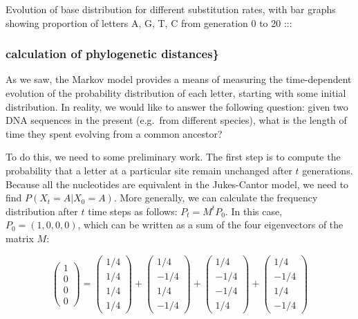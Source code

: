 \documentclass[
  letterpaper,
  DIV=11,
  numbers=noendperiod]{scrreprt}
\begin{document}
Evolution of base distribution for different substitution rates, with
bar graphs showing proportion of letters A, G, T, C from generation 0 to
20 :::

\subsubsection{calculation of phylogenetic
distances\}}\label{calculation-of-phylogenetic-distances}

As we saw, the Markov model provides a means of measuring the
time-dependent evolution of the probability distribution of each letter,
starting with some initial distribution. In reality, we would like to
answer the following question: given two DNA sequences in the present
(e.g.~from different species), what is the length of time they spent
evolving from a common ancestor?

To do this, we need to some preliminary work. The first step is to
compute the probability that a letter at a particular site remain
unchanged after \(t\) generations. Because all the nucleotides are
equivalent in the Jukes-Cantor model, we need to find
\(P(X_t = A | X_0 = A)\). More generally, we can calculate the frequency
distribution after \(t\) time steps as follows: \(P_t = M^t P_0\). In
this case, \(P_0 = (1,0,0,0)\), which can be written as a sum of the
four eigenvectors of the matrix \(M\):

\[ 
\left(\begin{array}{c} 1 \\ 0 \\ 0 \\ 0 \end{array}\right) = \left(\begin{array}{c} 1/4 \\ 1/4 \\ 1/4 \\ 1/4 \end{array}\right) + \left(\begin{array}{c} 1/4 \\ -1/4 \\ 1/4 \\ -1/4 \end{array}\right) +  \left(\begin{array}{c} 1/4 \\ -1/4 \\ -1/4 \\ 1/4 \end{array}\right) + \left(\begin{array}{c} 1/4 \\ -1/4 \\ 1/4 \\ -1/4 \end{array}\right) 
\]
\end{document}
